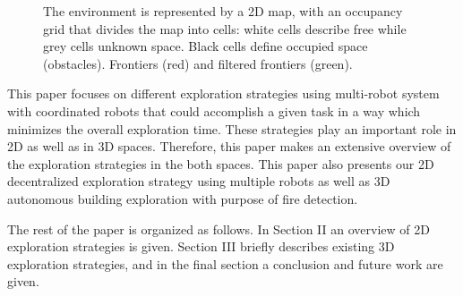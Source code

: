\begin{figure}[t!]
	\centering
	\caption {The environment is represented by a 2D map, with an occupancy grid that divides the map into cells: white cells describe free while grey cells unknown space. Black cells define occupied space (obstacles). Frontiers (red) and filtered frontiers (green).}
	\label{fig:environment}
\end{figure}

This paper focuses on different exploration strategies using multi-robot system with coordinated robots that could accomplish a given task in a way which minimizes the overall exploration time. These strategies play an important role in 2D as well as in 3D spaces. Therefore, this paper makes an extensive overview of the exploration strategies in the both spaces. This paper also presents our 2D decentralized exploration strategy using multiple robots as well as 3D autonomous building exploration with purpose of fire detection.

The rest of the paper is organized as follows. 
In Section II an overview of 2D exploration strategies is given. Section III briefly describes existing 3D exploration strategies, and in the final section a conclusion and future work are given.
